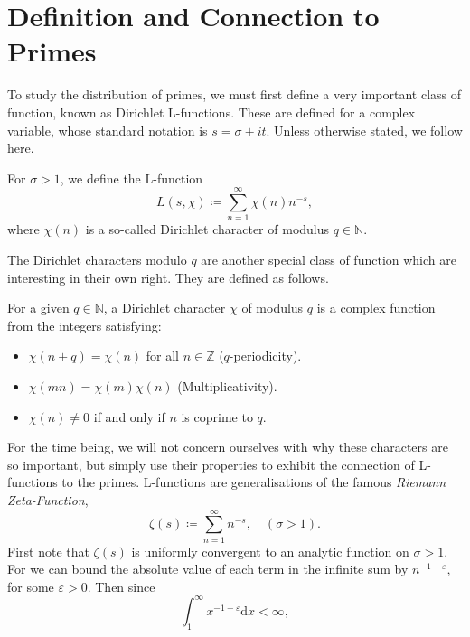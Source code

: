 \section{Definition and Connection to Primes}
To study the distribution of primes, we must first define a very important class of function, known as Dirichlet L-functions. These are defined for a complex variable, whose standard notation is $s = \sigma + i t$. Unless otherwise stated, we follow \cite{ireland_rosen_1990} here.
\begin{definition}
\label{LFunctionDefinition}
For $\sigma > 1$, we define the L-function
\begin{equation}
    L(s, \chi) \coloneqq \sum_{n=1}^{\infty} \chi(n) n^{-s}, \nonumber
\end{equation}
where $\chi(n)$ is a so-called Dirichlet character of modulus $q \in \mathbb{N}$.
\end{definition}
The Dirichlet characters modulo $q$ are another special class of function which are interesting in their own right. They are defined as follows.
\begin{definition}
\label{DirichletCharacterDefinition}
For a given $q \in \mathbb{N}$, a Dirichlet character $\chi$ of modulus $q$ is a complex function from the integers satisfying:
\begin{itemize}
    \item $\chi(n + q) = \chi(n)$ for all $n \in \mathbb{Z}$ ($q$-periodicity).
    \item $\chi(m n) = \chi(m) \chi(n)$ (Multiplicativity).
    \item $\chi(n) \neq 0$ if and only if $n$ is coprime to $q$.
\end{itemize}
\end{definition}
For the time being, we will not concern ourselves with why these characters are so important, but simply use their properties to exhibit the connection of L-functions to the primes. L-functions are generalisations of the famous \textit{Riemann Zeta-Function},
\begin{equation}
    \zeta(s) \coloneqq \sum_{n=1}^{\infty} n^{-s}, \quad (\sigma > 1).
\end{equation}
First note that $\zeta(s)$ is uniformly convergent to an analytic function on $\sigma > 1$. For we can bound the absolute value of each term in the infinite sum by $n^{-1 - \varepsilon}$, for some $\varepsilon > 0$. Then since
\begin{equation}
    \int_{1}^{\infty} x^{-1 - \varepsilon} \mathrm{d}x < \infty, \nonumber 
\end{equation}
